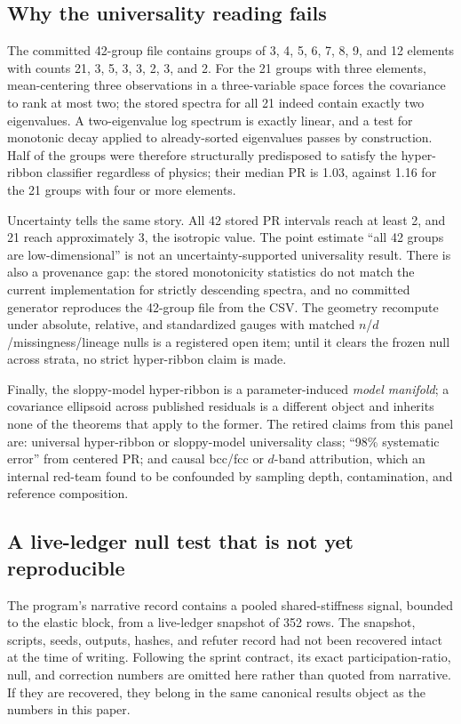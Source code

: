 \documentclass[11pt]{article}
\newcommand{\PR}{\mathrm{PR}}
\begin{document}
\subsection{Why the universality reading fails}

The committed 42-group file contains groups of 3, 4, 5, 6, 7, 8, 9, and 12 elements with counts 21, 3, 5, 3, 3, 2, 3, and 2. For the 21 groups with three elements, mean-centering three observations in a three-variable space forces the covariance to rank at most two; the stored spectra for all 21 indeed contain exactly two eigenvalues. A two-eigenvalue log spectrum is exactly linear, and a test for monotonic decay applied to already-sorted eigenvalues passes by construction. Half of the groups were therefore structurally predisposed to satisfy the hyper-ribbon classifier regardless of physics; their median $\PR$ is 1.03, against 1.16 for the 21 groups with four or more elements.

Uncertainty tells the same story. All 42 stored $\PR$ intervals reach at least 2, and 21 reach approximately 3, the isotropic value. The point estimate ``all 42 groups are low-dimensional'' is not an uncertainty-supported universality result. There is also a provenance gap: the stored monotonicity statistics do not match the current implementation for strictly descending spectra, and no committed generator reproduces the 42-group file from the CSV. The geometry recompute under absolute, relative, and standardized gauges with matched $n$/$d$/missingness/lineage nulls is a registered open item; until it clears the frozen null across strata, no strict hyper-ribbon claim is made.

Finally, the sloppy-model hyper-ribbon is a parameter-induced \emph{model manifold}; a covariance ellipsoid across published residuals is a different object and inherits none of the theorems that apply to the former. The retired claims from this panel are: universal hyper-ribbon or sloppy-model universality class; ``98\% systematic error'' from centered $\PR$; and causal bcc/fcc or $d$-band attribution, which an internal red-team found to be confounded by sampling depth, contamination, and reference composition.

\subsection{A live-ledger null test that is not yet reproducible}

The program's narrative record contains a pooled shared-stiffness signal, bounded to the elastic block, from a live-ledger snapshot of 352 rows. The snapshot, scripts, seeds, outputs, hashes, and refuter record had not been recovered intact at the time of writing. Following the sprint contract, its exact participation-ratio, null, and correction numbers are omitted here rather than quoted from narrative. If they are recovered, they belong in the same canonical results object as the numbers in this paper.
\end{document}
